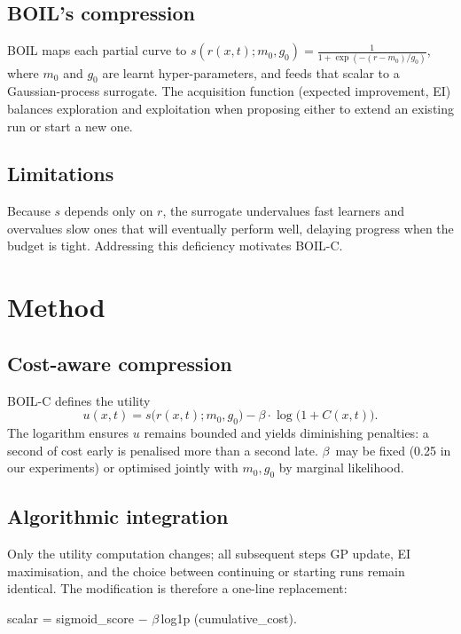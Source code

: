 \documentclass{article} %
\begin{document}
\subsection{BOIL's compression}
BOIL maps each partial curve to \(s(r(x,t);m_0,g_0)=\frac{1}{1+\exp(-(r-m_0)/g_0)}\), where \(m_0\) and \(g_0\) are learnt hyper-parameters, and feeds that scalar to a Gaussian-process surrogate. The acquisition function (expected improvement, EI) balances exploration and exploitation when proposing either to extend an existing run or start a new one.

\subsection{Limitations}
Because \(s\) depends only on \(r\), the surrogate undervalues fast learners and overvalues slow ones that will eventually perform well, delaying progress when the budget is tight. Addressing this deficiency motivates BOIL-C.

\section{Method}\label{sec:method}%
\subsection{Cost-aware compression}
BOIL-C defines the utility
\[ u(x,t) = s\big(r(x,t); m_0, g_0\big) - \beta\cdot\log\big(1 + C(x,t)\big). \]
The logarithm ensures \(u\) remains bounded and yields diminishing penalties: a second of cost early is penalised more than a second late. \(\beta\)\ may be fixed (0.25 in our experiments) or optimised jointly with \(m_0,g_0\) by marginal likelihood.

\subsection{Algorithmic integration}
Only the utility computation changes; all subsequent steps GP update, EI maximisation, and the choice between continuing or starting runs remain identical. The modification is therefore a one-line replacement:

scalar = sigmoid\_score $-$ \(\beta\)\,log1p (cumulative\_cost).
\end{document}
